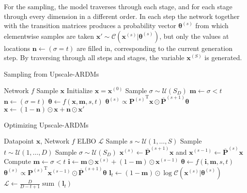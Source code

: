 \documentclass{article} \usepackage{iclr2022_conference,times}
\def\vi{{\bm{i}}}
\def\vl{{\bm{l}}}
\def\vm{{\bm{m}}}
\def\vn{{\bm{n}}}
\def\vx{{\bm{x}}}
\begin{document}
For the sampling, the model traverses through each stage, and for each stage through every dimension in a different order. In each step the network together with the transition matrices produces a probability vector $\boldsymbol{\theta}^{(s)}$ from which elementwise samples are taken $\vx' \sim \mathcal{C}(\vx^{(s)} | \boldsymbol{\theta}^{(s)})$, but only the values at locations $\vn \leftarrow (\sigma = t)$ are filled in, corresponding to the current generation step. By traversing through all steps and stages, the variable $\vx^{(S)}$ is generated.
\begin{table}[h]
\begin{minipage}[t]{.47\textwidth}
\begin{algorithm}[H]
   \caption{Sampling from Upscale-ARDMs}
   \label{alg:sample_upscale_ardms}
\begin{algorithmic}
 Network $f$
    Sample $\vx$
\STATE Initialize $\vx = \vx^{(0)}$
\STATE Sample $\sigma \sim \mathcal{U}(S_D)$
\STATE $\vm \leftarrow \sigma < t$
\STATE $\vn \leftarrow (\sigma = t)$
\STATE $\boldsymbol{\theta} \leftarrow f(\vx, \vm, s, t)$
\STATE $\boldsymbol{\theta}^{(s)} \propto {\mathbf{P}^{(s)}}^\mathrm{T} \vx \odot \overline{\mathbf{P}}^{(s+1)} \boldsymbol{\theta}$ 
    \STATE {$\vx' \sim \mathcal{C}(\vx^{(s)} | \boldsymbol{\theta}^{(s)})$ }
    \STATE $\vx \leftarrow  (1 - \vn) \odot \vx + \vn \odot \vx'$
\ENDFOR
\ENDFOR
\end{algorithmic}
\end{algorithm}
\end{minipage}
\hfill
\begin{minipage}[t]{.47\textwidth}
\begin{algorithm}[H]
   \caption{Optimizing Upscale-ARDMs}
   \label{alg:optimize_upscale_ardms}
\begin{algorithmic}
    Datapoint $\vx$, Network $f$
    ELBO $\mathcal{L}$
\STATE Sample $s \sim \mathcal{U}(1, \ldots, S)$
\STATE Sample $t \sim \mathcal{U}(1, \ldots, D)$
\STATE Sample $\sigma \sim \mathcal{U}(S_D)$
\STATE $\vx^{(s)}  \leftarrow \overline{\mathbf{P}}^{(s+1)} \vx$ and $\vx^{(s-1)}  \leftarrow \overline{\mathbf{P}}^{(s)}\vx$
\STATE Compute $\vm \leftarrow  \sigma < t$
\STATE $\vi \leftarrow \vm \odot \vx^{(s)} + (1 - \vm) \odot \vx^{(s-1)}$
\STATE $\boldsymbol{\theta} \leftarrow f(\vi, \vm, s, t)$
\STATE $\boldsymbol{\theta}^{(s)} \propto {\mathbf{P}^{(s)}}^\mathrm{T} \vx^{(s-1)} \odot \overline{\mathbf{P}}^{(s+1)} \boldsymbol{\theta}$ 
\STATE $\vl_t \leftarrow (1 - \vm) \odot \log \mathcal{C}(\vx^{(s)} | \boldsymbol{\theta}^{(s)})$
\STATE $\mathcal{L} \leftarrow  \frac{D}{D - t + 1} \operatorname{sum} (\vl_t)$
\end{algorithmic}
\end{algorithm}
\end{minipage}
\end{table}
\end{document}
